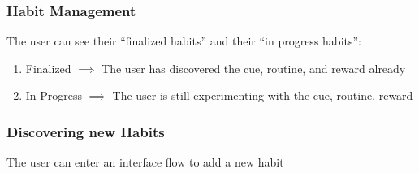 \subsubsection{Habit Management}
The user can see their “finalized habits” and their “in progress habits”:

\begin{enumerate}
    \item Finalized $\implies$ The user has discovered the cue, routine, and reward already
    \item In Progress $\implies$ The user is still experimenting with the cue, routine, reward
\end{enumerate}
\subsubsection{Discovering new Habits}    
The user can enter an interface flow to add a new habit
